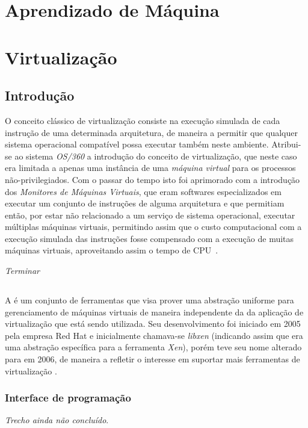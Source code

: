 %
%

\chapter{Aprendizado de Máquina}\label{sec:aprendizado}



\chapter{Virtualização}

\section{Introdução}\label{sec:virt}

O conceito clássico de virtualização consiste na execução simulada de cada
instrução de uma determinada arquitetura, de maneira a permitir que
qualquer sistema operacional compatível possa executar também neste
ambiente.  Atribui-se ao sistema \emph{OS/360} a introdução do conceito de
virtualização, que neste caso era limitada a apenas uma instância de uma
\emph{máquina virtual} para os processos não-privilegiados. Com o passar do
tempo isto foi aprimorado com a introdução dos \emph{Monitores de Máquinas
Virtuais}, que eram softwares especializados em executar um conjunto de
instruções de alguma arquitetura e que permitiam então, por estar não
relacionado a um serviço de sistema operacional, executar múltiplas
máquinas virtuais, permitindo assim que o custo computacional com a
execução simulada das instruções fosse compensado com a execução de muitas
máquinas virtuais, aproveitando assim o tempo de
CPU~\cite{goldberg1974survey}.

\emph{Terminar}



\section{\libvirt}\label{sec:libvirt}


A \libvirt{} é um conjunto de ferramentas que visa prover uma abstração
uniforme para gerenciamento de máquinas virtuais de maneira independente da
da aplicação de virtualização que está sendo utilizada. Seu desenvolvimento
foi iniciado em 2005 pela empresa Red Hat e inicialmente chamava-se
\emph{libxen} (indicando assim que era uma abstração específica para a
ferramenta \emph{Xen}), porém teve seu nome alterado para \libvirt{} em
2006, de maneira a refletir o interesse em suportar mais ferramentas de
virtualização .

\subsection{Interface de programação}\label{sec:libvirtapi}

\emph{Trecho ainda não concluído}.
